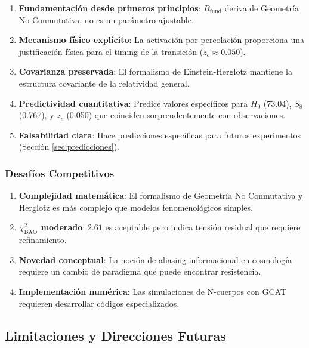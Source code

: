 \documentclass[12pt, a4paper]{article}
\theoremstyle{plain}
\theoremstyle{definition}
\begin{document}
\begin{enumerate}
    \item \textbf{Fundamentación desde primeros principios}: $R_{\mathrm{fund}}$ deriva de Geometría No Conmutativa, no es un parámetro ajustable.
    
    \item \textbf{Mecanismo físico explícito}: La activación por percolación proporciona una justificación física para el timing de la transición ($z_c \approx 0.050$).
    
    \item \textbf{Covarianza preservada}: El formalismo de Einstein-Herglotz mantiene la estructura covariante de la relatividad general.
    
    \item \textbf{Predictividad cuantitativa}: Predice valores específicos para $H_0$ (73.04), $S_8$ (0.767), y $z_c$ (0.050) que coinciden sorprendentemente con observaciones.
    
    \item \textbf{Falsabilidad clara}: Hace predicciones específicas para futuros experimentos (Sección \ref{sec:predicciones}).
\end{enumerate}

\subsubsection{Desafíos Competitivos}

\begin{enumerate}
    \item \textbf{Complejidad matemática}: El formalismo de Geometría No Conmutativa y Herglotz es más complejo que modelos fenomenológicos simples.
    
    \item \textbf{$\chi^2_{\mathrm{BAO}}$ moderado}: $2.61$ es aceptable pero indica tensión residual que requiere refinamiento.
    
    \item \textbf{Novedad conceptual}: La noción de aliasing informacional en cosmología requiere un cambio de paradigma que puede encontrar resistencia.
    
    \item \textbf{Implementación numérica}: Las simulaciones de N-cuerpos con GCAT requieren desarrollar códigos especializados.
\end{enumerate}

\subsection{Limitaciones y Direcciones Futuras}
\end{document}

